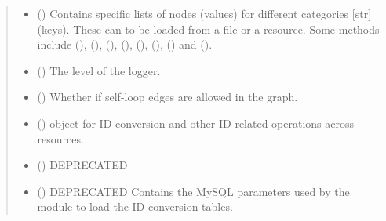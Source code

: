 \documentclass[letterpaper,10pt,english]{sphinxmanual}
\begin{document}
\begin{fulllineitems}
\begin{quote}
\begin{description}
\begin{itemize}
\item {} 
 () \textendash{} Contains specific lists of nodes (values) for different
categories {[}str{]} (keys). These can to be loaded from a file or
a resource. Some methods include
 (),
 (),
 (),
 (),
 (),
{\hyperref[\detokenize{reference:pypath.main.PyPath.signaling_proteins_list}]{}}
(), 
() and
{\hyperref[\detokenize{reference:pypath.main.PyPath.cancer_drivers_list}]{}} ().

\item {} 
 () \textendash{} The level of the logger.

\item {} 
 () \textendash{} Whether if self-loop edges are allowed in the graph.

\item {} 
 () \textendash{}  object for ID conversion and
other ID-related operations across resources.

\item {} 
 () \textendash{} DEPRECATED

\item {} 
 () \textendash{} DEPRECATED Contains the MySQL parameters used by the
 module to load the ID conversion
tables.


\end{itemize}
\end{description}
\end{quote}
\end{fulllineitems}
\end{document}
